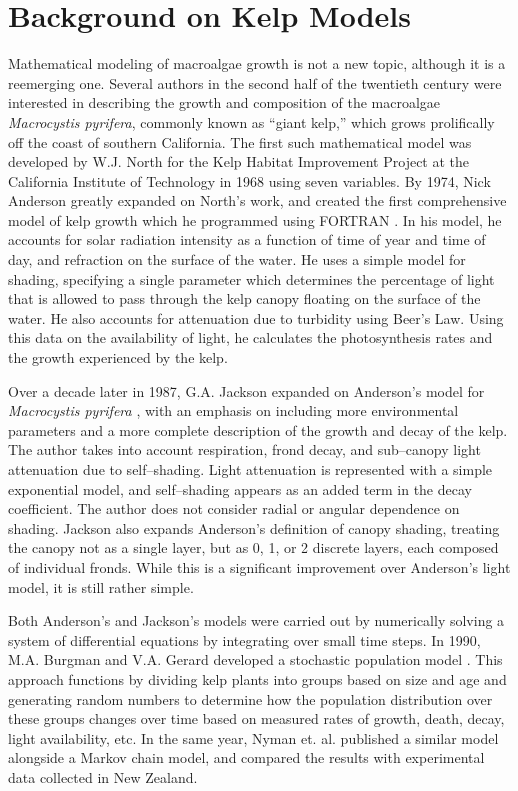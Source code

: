 \section{Background on Kelp Models}

Mathematical modeling of macroalgae growth is not a new topic, although it is a reemerging one.
Several authors in the second half of the twentieth century were interested in describing the growth and composition of the macroalgae \textit{Macrocystis pyrifera}, commonly known as ``giant kelp,'' which grows prolifically off the coast of southern California.
The first such mathematical model was developed by W.J. North for the Kelp Habitat Improvement Project at the California Institute of Technology in 1968 using seven variables.
By 1974, Nick Anderson greatly expanded on North's work, and created the first comprehensive model of kelp growth which he programmed using FORTRAN \cite{anderson_mathematical_1974}.
In his model, he accounts for solar radiation intensity as a function of time of year and time of day, and refraction on the surface of the water.
He uses a simple model for shading, specifying a single parameter which determines the percentage of light that is allowed to pass through the kelp canopy floating on the surface of the water.
He also accounts for attenuation due to turbidity using Beer's Law.
Using this data on the availability of light, he calculates the photosynthesis rates and the growth experienced by the kelp.

Over a decade later in 1987, G.A.
Jackson expanded on Anderson's model for \textit{Macrocystis pyrifera} \cite{jackson_modelling_1987}, with an emphasis on including more environmental parameters and a more complete description of the growth and decay of the kelp.
The author takes into account respiration, frond decay, and sub--canopy light attenuation due to self--shading.
Light attenuation is represented with a simple exponential model, and self--shading appears as an added term in the decay coefficient.
The author does not consider radial or angular dependence on shading.
Jackson also expands Anderson's definition of canopy shading, treating the canopy not as a single layer, but as 0, 1, or 2 discrete layers, each composed of individual fronds.
While this is a significant improvement over Anderson's light model, it is still rather simple.

Both Anderson's and Jackson's models were carried out by numerically solving a system of differential equations by integrating over small time steps.
In 1990, M.A. Burgman and V.A. Gerard developed a stochastic population model \cite{burgman_stage-structured_1990}.
This approach functions by dividing kelp plants into groups based on size and age and generating random numbers to determine how the population distribution over these groups changes over time based on measured rates of growth, death, decay, light availability, etc.
In the same year, Nyman et. al. \cite{nyman_macrocystis_1990} published a similar model alongside a Markov chain model, and compared the results with experimental data collected in New Zealand.

